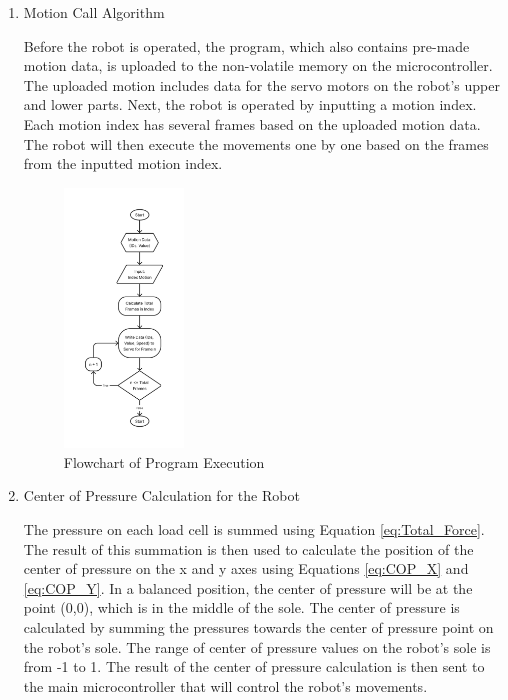 \begin{enumerate}[label=\Alph*.]
    \item Motion Call Algorithm
    \label{subsec:motionalgorithm}

    \hspace*{1em} Before the robot is operated, the program, which also contains pre-made motion data, is uploaded to the non-volatile memory on the microcontroller. The uploaded motion includes data for the servo motors on the robot's upper and lower parts. Next, the robot is operated by inputting a motion index. Each motion index has several frames based on the uploaded motion data. The robot will then execute the movements one by one based on the frames from the inputted motion index.

    \begin{figure} [h]
      \centering
      \includegraphics[width=0.3\textwidth]{gambar/flowchart_play_index.png}
      \caption{Flowchart of Program Execution}
      \label{fig:Algoritma_Berjalan}
    \end{figure}

    \item Center of Pressure Calculation for the Robot
    \label{subsec:centerofpressurecalculation}

    \hspace*{1em} The pressure on each load cell is summed using Equation \ref{eq:Total_Force}. The result of this summation is then used to calculate the position of the center of pressure on the x and y axes using Equations \ref{eq:COP_X} and \ref{eq:COP_Y}. In a balanced position, the center of pressure will be at the point (0,0), which is in the middle of the sole. The center of pressure is calculated by summing the pressures towards the center of pressure point on the robot's sole. The range of center of pressure values on the robot's sole is from -1 to 1. The result of the center of pressure calculation is then sent to the main microcontroller that will control the robot's movements. 


\end{enumerate}
